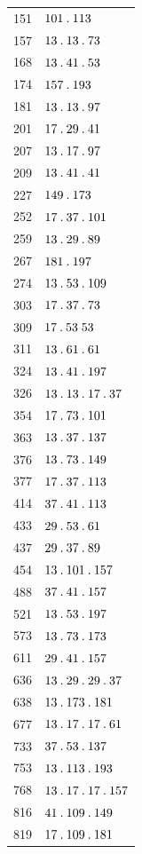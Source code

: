\begin{longtable}{@{}r|l@{}}
151 & $101\mathbin{.} 113$\\
157 & $13\mathbin{.} 13\mathbin{.} 73$\\
168 & $13\mathbin{.} 41\mathbin{.} 53$\\
174 & $157\mathbin{.} 193$\\
181 & $13\mathbin{.} 13\mathbin{.} 97$\\
201 & $17\mathbin{.} 29\mathbin{.} 41$\\
207 & $13\mathbin{.} 17\mathbin{.} 97$\\
209 & $13\mathbin{.} 41\mathbin{.} 41$\\
227 & $149\mathbin{.} 173$\\
252 & $17\mathbin{.} 37\mathbin{.} 101$\\
259 & $13\mathbin{.} 29\mathbin{.} 89$\\
267 & $181\mathbin{.} 197$\\
274 & $13\mathbin{.} 53\mathbin{.} 109$\\
303 & $17\mathbin{.} 37\mathbin{.} 73$\\
309 & $17\mathbin{.} 53\;53$\\
311 & $13\mathbin{.} 61\mathbin{.} 61$\\
324 & $13\mathbin{.} 41\mathbin{.} 197$\\
326 & $13\mathbin{.} 13\mathbin{.} 17\mathbin{.} 37$\\
354 & $17\mathbin{.} 73\mathbin{.} 101$\\
363 & $13\mathbin{.} 37\mathbin{.} 137$\\
376 & $13\mathbin{.} 73\mathbin{.} 149$\\
377 & $17\mathbin{.} 37\mathbin{.} 113$\\
414 & $37\mathbin{.} 41\mathbin{.} 113$\\
433 & $29\mathbin{.} 53\mathbin{.} 61$\\
437 & $29\mathbin{.} 37\mathbin{.} 89$\\
454 & $13\mathbin{.} 101\mathbin{.} 157$\\
488 & $37\mathbin{.} 41\mathbin{.} 157$\\
521 & $13\mathbin{.} 53\mathbin{.} 197$\\
573 & $13\mathbin{.} 73\mathbin{.} 173$\\
611 & $29\mathbin{.} 41\mathbin{.} 157$\\
636 & $13\mathbin{.} 29\mathbin{.} 29\mathbin{.} 37$\\
638 & $13\mathbin{.} 173\mathbin{.} 181$\\
677 & $13\mathbin{.} 17\mathbin{.} 17\mathbin{.} 61$\\
733 & $37\mathbin{.} 53\mathbin{.} 137$\\
753 & $13\mathbin{.} 113\mathbin{.} 193$\\
768 & $13\mathbin{.} 17\mathbin{.} 17\mathbin{.} 157$\\
816 & $41\mathbin{.} 109\mathbin{.} 149$\\
819 & $17\mathbin{.} 109\mathbin{.} 181$\\

\end{longtable}
